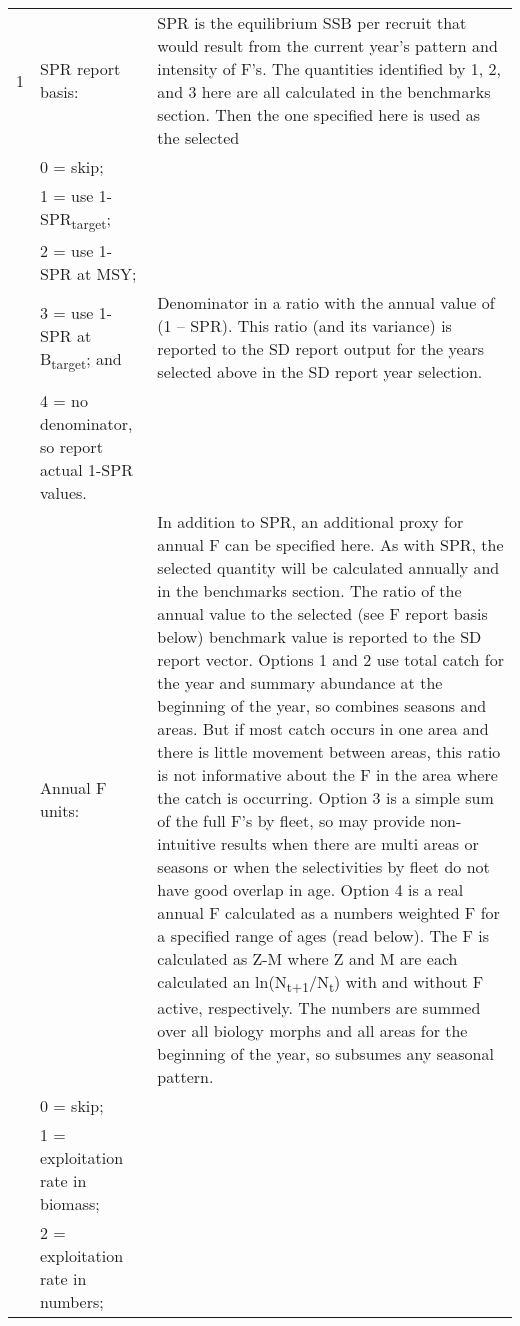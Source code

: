 {\begin{landscape}
\begin{longtable}{p{1.5cm} p{7.2cm} p{12.3cm}}
 \hline
 1 & SPR report basis: & \multirow{1}{1cm}[-0.25cm]{\parbox{12.5cm}{SPR is the equilibrium SSB per recruit that would result from the current year’s pattern and intensity of F’s.  The quantities identified by 1, 2, and 3 here are all calculated in the benchmarks section.  Then the one specified here is used as the selected }}\Tstrut\\
   & 0 = skip; & \\
   & 1 = use 1-SPR\textsubscript{target}; & \\
   & 2 = use 1-SPR at MSY; & \Tstrut\\
   & 3 = use 1-SPR at B\textsubscript{target}; and & \multirow{1}{1cm}[-0.25cm]{\parbox{12.5cm}{Denominator in a ratio with the annual value of (1 – SPR). This ratio (and its variance) is reported to the SD report output for the years selected above in the SD report year selection.}}\Tstrut\\
   & 4 = no denominator, so report actual 1-SPR values. & \\
  
 \pagebreak
 \hline 
 4 & Annual F units: &  \multirow{1}{1cm}[-0.25cm]{\parbox{12.5cm}{In addition to SPR, an additional proxy for annual F can be specified here.  As with SPR, the selected quantity will be calculated annually and in the benchmarks section.  The ratio of the annual value to the selected (see F report basis below) benchmark value is reported to the SD report vector.  Options 1 and 2 use total catch for the year and summary abundance at the beginning of the year, so combines seasons and areas.  But if most catch occurs in one area and there is little movement between areas, this ratio is not informative about the F in the area where the catch is occurring.  Option 3 is a simple sum of the full F’s by fleet, so may provide non-intuitive results when there are multi areas or seasons or when the selectivities by fleet do not have good overlap in age.  Option 4 is a real annual F calculated as a numbers weighted F for a specified range of ages (read below).  The F is calculated as Z-M where Z and M are each calculated an ln(N\textsubscript{t+1}/N\textsubscript{t}) with and without F active, respectively. The numbers are summed over all biology morphs and all areas for the beginning of the year, so subsumes any seasonal pattern.}}\Tstrut\\
   & 0 = skip; & \\
   & 1 = exploitation rate in biomass; & \\
   & 2 = exploitation rate in numbers; & \\


\end{longtable}
\end{landscape}}
